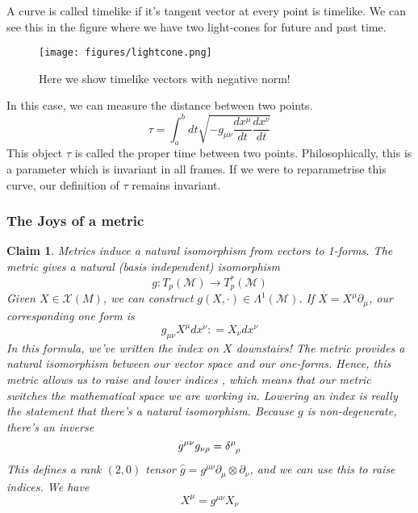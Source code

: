 \documentclass[11pt, a4paper]{article}   	%
\theoremstyle{slplain}
\newtheorem*{claim}{Claim}
\begin{document}
A curve is called timelike if it's tangent 
vector at every point is timelike. We can see this in the figure 
where we have two light-cones for future and past time. 
\begin{figure}[h]
	\centering
	\hspace*{3cm}\texttt{[image: figures/lightcone.png]}
	\caption{Here we show timelike vectors with negative norm!}%
	\label{fig:figures / lightcones}
\end{figure}
In this case, we can measure the distance between two points. 
\[
\tau = \int_{ a} ^ b dt \sqrt{  - g_{ \mu \nu } \frac{dx^ \mu }{ dt } \frac{ dx ^ \nu }{ dt }} 
\] This object $ \tau $ is called the proper time 
between two points. Philosophically, this is a parameter which is 
invariant in all frames. 
If we were to reparametrise this curve, our 
definition of $ \tau $ remains invariant. 

\subsubsection{The Joys of a metric}

\begin{claim}{Metrics induce a natural isomorphism from vectors to 1-forms.} 
The metric gives a natural (basis independent) isomorphism 
\[
g : T_p ( \mathcal{ M }) \to T_p ^ * ( \mathcal{ M } ) 
\] Given $ X \in \mathcal{ X } \left( M  \right) $, we can construct 
$ g ( X , \cdot  ) \in \Lambda^ 1 ( \mathcal{ M }) $. 
If $ X = X^ \mu \partial _ \mu $, our corresponding one form is 
\[
g_{ \mu \nu } X^ \mu dx^ \nu : = X_\nu dx^ \nu 
\] In this formula, we've written the index on $ X $ downstairs!
The metric provides a natural isomorphism between 
our vector space and our one-forms. Hence, 
this metric allows us to raise and lower indices ,
which means that our metric switches the mathematical space 
we are working in. 
Lowering an index is really the statement that there's a natural 
isomorphism. 
Because $ g $ is non-degenerate, there's an inverse
\[
g ^{ \mu \nu } g _{ \nu \rho } = \delta \indices{ ^ \mu _ \rho } 
\] This defines a rank $ ( 2, 0 ) $ tensor $ \hat{g} = g^{ \mu \nu } \partial  _\mu \otimes \partial  _ \nu  $, and 
we can use this to raise indices. We have 
\[
X^\mu = g ^{ \mu \nu } X_ \nu  
\]
\end{claim} 
\end{document}
